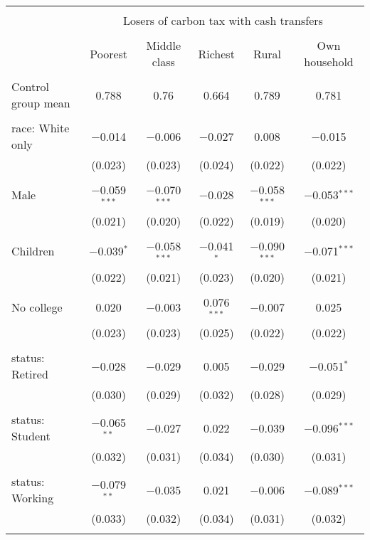 
\begin{tabular}{@{\extracolsep{5pt}}lccccc} 
\\[-1.8ex]\hline 
\hline \\[-1.8ex] 
 & \multicolumn{5}{c}{Losers of carbon tax with cash transfers} \\ 
\cline{2-6} 
\\[-1.8ex] & Poorest & Middle class & Richest & Rural & Own household \\ 
\hline \\[-1.8ex] 
 Control group mean & 0.788 & 0.76 & 0.664 & 0.789 & 0.781  \\ \hline \\[-1.8ex] race: White only & $-$0.014 & $-$0.006 & $-$0.027 & 0.008 & $-$0.015 \\ 
  & (0.023) & (0.023) & (0.024) & (0.022) & (0.022) \\ 
  & & & & & \\ 
 Male & $-$0.059$^{***}$ & $-$0.070$^{***}$ & $-$0.028 & $-$0.058$^{***}$ & $-$0.053$^{***}$ \\ 
  & (0.021) & (0.020) & (0.022) & (0.019) & (0.020) \\ 
  & & & & & \\ 
 Children & $-$0.039$^{*}$ & $-$0.058$^{***}$ & $-$0.041$^{*}$ & $-$0.090$^{***}$ & $-$0.071$^{***}$ \\ 
  & (0.022) & (0.021) & (0.023) & (0.020) & (0.021) \\ 
  & & & & & \\ 
 No college & 0.020 & $-$0.003 & 0.076$^{***}$ & $-$0.007 & 0.025 \\ 
  & (0.023) & (0.023) & (0.025) & (0.022) & (0.022) \\ 
  & & & & & \\ 
 status: Retired & $-$0.028 & $-$0.029 & 0.005 & $-$0.029 & $-$0.051$^{*}$ \\ 
  & (0.030) & (0.029) & (0.032) & (0.028) & (0.029) \\ 
  & & & & & \\ 
 status: Student & $-$0.065$^{**}$ & $-$0.027 & 0.022 & $-$0.039 & $-$0.096$^{***}$ \\ 
  & (0.032) & (0.031) & (0.034) & (0.030) & (0.031) \\ 
  & & & & & \\ 
 status: Working & $-$0.079$^{**}$ & $-$0.035 & 0.021 & $-$0.006 & $-$0.089$^{***}$ \\ 
  & (0.033) & (0.032) & (0.034) & (0.031) & (0.032) \\ 
  & & & & & \\ 

\end{tabular}

